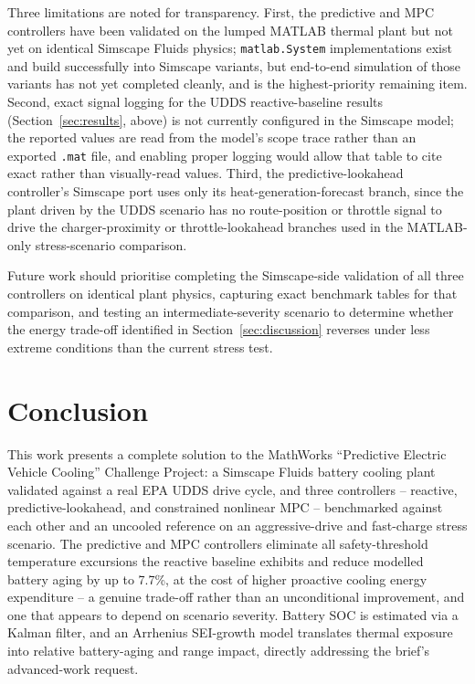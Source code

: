 \documentclass[10pt,conference]{IEEEtran}
\begin{document}
Three limitations are noted for transparency. First, the predictive and MPC controllers have been validated on the lumped MATLAB thermal plant but not yet on identical Simscape Fluids physics; \texttt{matlab.System} implementations exist and build successfully into Simscape variants, but end-to-end simulation of those variants has not yet completed cleanly, and is the highest-priority remaining item. Second, exact signal logging for the UDDS reactive-baseline results (Section~\ref{sec:results}, above) is not currently configured in the Simscape model; the reported values are read from the model's scope trace rather than an exported \texttt{.mat} file, and enabling proper logging would allow that table to cite exact rather than visually-read values. Third, the predictive-lookahead controller's Simscape port uses only its heat-generation-forecast branch, since the plant driven by the UDDS scenario has no route-position or throttle signal to drive the charger-proximity or throttle-lookahead branches used in the MATLAB-only stress-scenario comparison.

Future work should prioritise completing the Simscape-side validation of all three controllers on identical plant physics, capturing exact benchmark tables for that comparison, and testing an intermediate-severity scenario to determine whether the energy trade-off identified in Section~\ref{sec:discussion} reverses under less extreme conditions than the current stress test.

\section{Conclusion}
\label{sec:concl}

This work presents a complete solution to the MathWorks ``Predictive Electric Vehicle Cooling'' Challenge Project: a Simscape Fluids battery cooling plant validated against a real EPA UDDS drive cycle, and three controllers -- reactive, predictive-lookahead, and constrained nonlinear MPC -- benchmarked against each other and an uncooled reference on an aggressive-drive and fast-charge stress scenario. The predictive and MPC controllers eliminate all safety-threshold temperature excursions the reactive baseline exhibits and reduce modelled battery aging by up to 7.7\%, at the cost of higher proactive cooling energy expenditure -- a genuine trade-off rather than an unconditional improvement, and one that appears to depend on scenario severity. Battery SOC is estimated via a Kalman filter, and an Arrhenius SEI-growth model translates thermal exposure into relative battery-aging and range impact, directly addressing the brief's advanced-work request.
\end{document}
